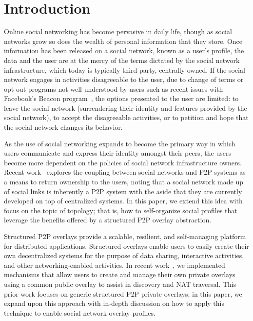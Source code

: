 \documentclass[letterpaper,twocolumn,10pt]{article}
\begin{document}
\section{Introduction}
Online social networking has become pervasive in daily life, though as social
networks grow so does the wealth of personal information that they store.  Once
information has been released on a social network, known as a user's profile,
the data and the user are at the mercy of the terms dictated by the social network 
infrastructure, which today is typically third-party, centrally owned.  If the social
network engages in activities disagreeable to the user, due to change of terms or
opt-out programs not well understood by users such as recent issues
with Facebook's Beacon program~\cite{facebook_beacon}, the options presented to the user are limited:
to leave the social network (surrendering their identity and features provided
by the social network), to accept the disagreeable activities, or to petition
and hope that the social network changes its behavior. 

As the use of social networking expands to become the primary way in which users
communicate and express their identity amongst their peers, the users become
more dependent on the policies of social network infrastructure owners.  Recent
work~\cite{p2p_socialnetwork} explores the coupling between social networks and
P2P systems as a means to return ownership to the users, noting that a social
network made up of social links is inherently a P2P system with the aside that
they are currently developed on top of centralized systems.  In this paper, we
extend this idea with focus on the topic of topology; that is, how to self-organize
social profiles that leverage the benefits offered by a structured P2P overlay abstraction.

Structured P2P overlays provide a scalable, resilient, and self-managing
platform for distributed applications.  Structured overlays enable users to
easily create their own decentralized systems for the purpose of data sharing,
interactive activities, and other networking-enabled activities.  In recent
work~\cite{icdcs10}, we implemented mechanisms that allow users to create
and manage their own private overlays using a common public overlay to assist
in discovery and NAT traversal. This prior work focuses on generic structured
P2P private overlays; in this paper, we
expand upon this approach with in-depth discussion on how to apply this technique to
enable social network overlay profiles.
\end{document}
